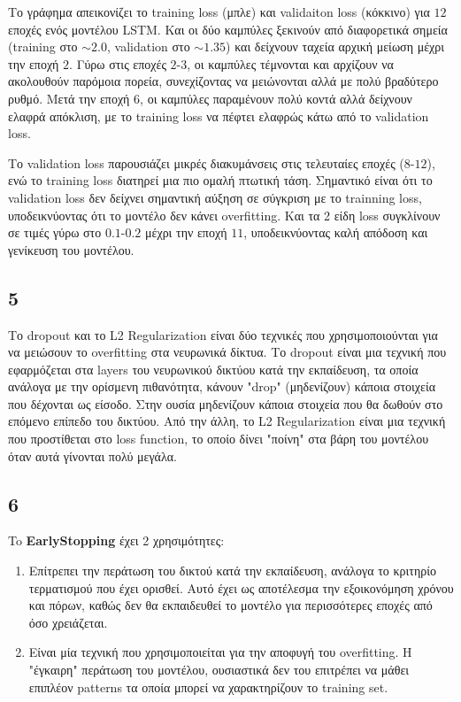 \documentclass[a4paper,12pt]{article}
\begin{document}
Το γράφημα απεικονίζει το training loss (μπλε) και validaiton loss (κόκκινο) για $12$ εποχές ενός μοντέλου LSTM.
Και οι δύο καμπύλες ξεκινούν από διαφορετικά σημεία (training στο $\sim2.0$, validation στο $\sim1.35$)
και δείχνουν ταχεία αρχική μείωση μέχρι την εποχή $2$. Γύρω στις εποχές $2$-$3$, οι καμπύλες τέμνονται και
αρχίζουν να ακολουθούν παρόμοια πορεία, συνεχίζοντας να μειώνονται αλλά με πολύ βραδύτερο ρυθμό. Μετά την εποχή $6$,
οι καμπύλες παραμένουν πολύ κοντά αλλά δείχνουν ελαφρά απόκλιση, με το training loss να πέφτει ελαφρώς κάτω από το validation loss.

Το validation loss παρουσιάζει μικρές διακυμάνσεις στις τελευταίες εποχές ($8$-$12$), ενώ το training loss διατηρεί
μια πιο ομαλή πτωτική τάση. Σημαντικό είναι ότι το validation loss δεν δείχνει σημαντική αύξηση σε σύγκριση με το trainning loss,
υποδεικνύοντας ότι το μοντέλο δεν κάνει overfitting. Και τα 2 είδη loss συγκλίνουν σε τιμές
γύρω στο $0.1$-$0.2$ μέχρι την εποχή $11$, υποδεικνύοντας καλή απόδοση και γενίκευση του μοντέλου.

\subsection*{5}
Το dropout και το L2 Regularization είναι δύο τεχνικές που
χρησιμοποιούνται για να μειώσουν το overfitting στα νευρωνικά δίκτυα.
Το dropout είναι μια τεχνική που εφαρμόζεται στα layers του
νευρωνικού δικτύου κατά την εκπαίδευση, τα οποία ανάλογα με την ορίσμενη
πιθανότητα, κάνουν "drop" (μηδενίζουν) κάποια στοιχεία που δέχονται ως
είσοδο. Στην ουσία μηδενίζουν κάποια στοιχεία που θα δωθούν στο επόμενο
επίπεδο του δικτύου. Από την άλλη, το L2 Regularization είναι μια
τεχνική που προστίθεται στο loss function, το οποίο δίνει "ποίνη"
στα βάρη του μοντέλου όταν αυτά γίνονται πολύ μεγάλα.

\subsection*{6}

To \textbf{EarlyStopping} έχει 2 χρησιμότητες:

\begin{enumerate}
    \item Επίτρεπει την περάτωση του δικτού κατά την εκπαίδευση, ανάλογα το κριτηρίο τερματισμού
          που έχει ορισθεί. Αυτό έχει ως αποτέλεσμα την εξοικονόμηση χρόνου και πόρων,
          καθώς δεν θα εκπαιδευθεί το μοντέλο για περισσότερες εποχές από όσο χρειάζεται.

    \item Είναι μία τεχνική που χρησιμοποιείται για την αποφυγή του overfitting.
          Η "έγκαιρη" περάτωση του μοντέλου, ουσιαστικά δεν του επιτρέπει να μάθει
          επιπλέον patterns τα οποία μπορεί να χαρακτηρίζουν το training set.
\end{enumerate}
\end{document}
